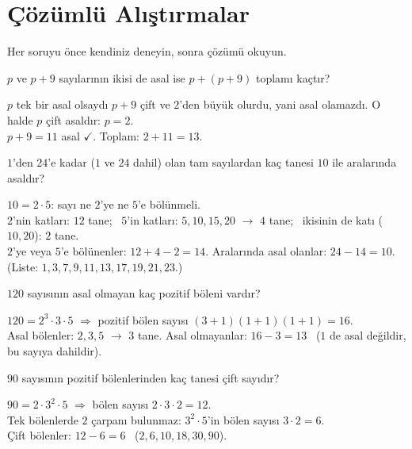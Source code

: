 \section{Çözümlü Alıştırmalar}
Her soruyu önce kendiniz deneyin, sonra çözümü okuyun.

\begin{alistirma}
\(p\) ve \(p+9\) sayılarının ikisi de asal ise \(p+(p+9)\) toplamı kaçtır?
\end{alistirma}
\begin{cozum}
\(p\) tek bir asal olsaydı \(p+9\) çift ve \(2\)'den büyük olurdu, yani asal olamazdı. O halde \(p\) çift asaldır: \(p=2\).\\
\(p+9=11\) asal \(\checkmark\). \quad Toplam: \(2+11=13\).
\end{cozum}

\begin{alistirma}
\(1\)'den \(24\)'e kadar (\(1\) ve \(24\) dahil) olan tam sayılardan kaç tanesi \(10\) ile aralarında asaldır?
\end{alistirma}
\begin{cozum}
\(10=2\cdot 5\): sayı ne \(2\)'ye ne \(5\)'e bölünmeli.\\
\(2\)'nin katları: \(12\) tane; \ \(5\)'in katları: \(5,10,15,20\) \(\to\) \(4\) tane; \ ikisinin de katı (\(10,20\)): \(2\) tane.\\
\(2\)'ye veya \(5\)'e bölünenler: \(12+4-2=14\). \quad Aralarında asal olanlar: \(24-14=10\).\\
(Liste: \(1,3,7,9,11,13,17,19,21,23\).)
\end{cozum}

\begin{alistirma}
\(120\) sayısının asal olmayan kaç pozitif böleni vardır?
\end{alistirma}
\begin{cozum}
\(120=2^3\cdot 3\cdot 5\) \(\Rightarrow\) pozitif bölen sayısı \((3+1)(1+1)(1+1)=16\).\\
Asal bölenler: \(2,3,5\) \(\to\) \(3\) tane. \quad Asal olmayanlar: \(16-3=13\) \ (\(1\) de asal değildir, bu sayıya dahildir).
\end{cozum}

\begin{alistirma}
\(90\) sayısının pozitif bölenlerinden kaç tanesi çift sayıdır?
\end{alistirma}
\begin{cozum}
\(90=2\cdot 3^2\cdot 5\) \(\Rightarrow\) bölen sayısı \(2\cdot 3\cdot 2=12\).\\
Tek bölenlerde \(2\) çarpanı bulunmaz: \(3^2\cdot 5\)'in bölen sayısı \(3\cdot 2=6\).\\
Çift bölenler: \(12-6=6\) \ (\(2,6,10,18,30,90\)).
\end{cozum}

